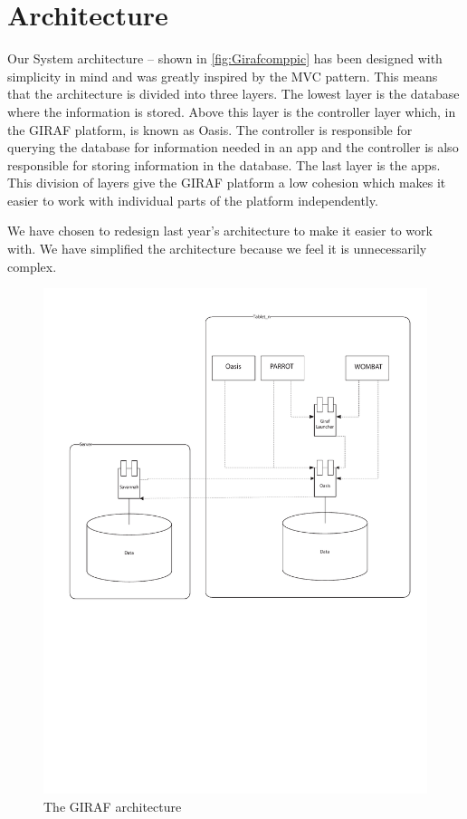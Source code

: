 \section{Architecture}
Our System architecture -- shown in \autoref{fig:Girafcomppic} has been designed with simplicity in mind and was greatly inspired by the MVC pattern. This means that the architecture is divided into three layers. The lowest layer is the database where the information is stored. Above this layer is the controller layer which, in the GIRAF platform, is known as Oasis. The controller is responsible for querying the database for information needed in an app and the controller is also responsible for storing information in the database. The last layer is the apps. This division of layers give the GIRAF platform a low cohesion which makes it easier to work with individual parts of the platform independently.

We have chosen to redesign last year's architecture \cite{LastYearsArchitecture} to make it easier to work with. We have simplified the architecture because we feel it is unnecessarily complex.

\begin{figure}
	\centering
		\includegraphics[width=\textwidth]{images/GirafComp.pdf}
	\caption{The GIRAF architecture}
	\label{fig:Girafcomppic}
\end{figure}
